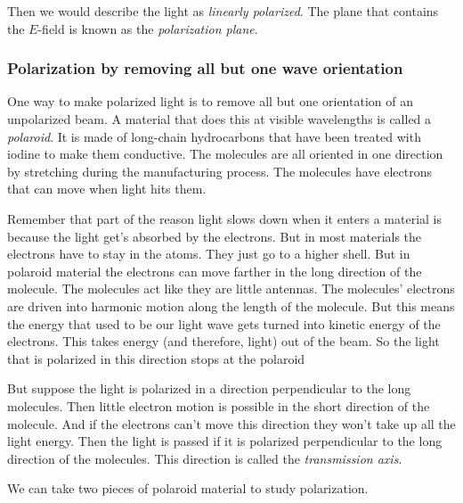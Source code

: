 \documentclass{article}
\begin{document}
Then we would describe the light as \emph{linearly polarized}. The plane
that contains the $E$-field is known as the \emph{polarization plane}.

\subsubsection{Polarization by removing all but one wave orientation}

One way to make polarized light is to remove all but one orientation of an
unpolarized beam. A material that does this at visible wavelengths is called
a \emph{polaroid}. It is made of long-chain hydrocarbons that have been
treated with iodine to make them conductive. The molecules are all oriented
in one direction by stretching during the manufacturing process. The
molecules have electrons that can move when light hits them.

Remember that part of the reason light slows down when it enters a material
is because the light get's absorbed by the electrons. But in most materials
the electrons have to stay in the atoms. They just go to a higher shell. But
in polaroid material the electrons can move farther in the long direction of
the molecule. The molecules act like they are little antennas. The
molecules' electrons are driven into harmonic motion along the length of the
molecule. But this means the energy that used to be our light wave gets
turned into kinetic energy of the electrons. This takes energy (and
therefore, light) out of the beam. So the light that is polarized in this
direction stops at the polaroid

But suppose the light is polarized in a direction perpendicular to the long
molecules. Then little electron motion is possible in the short direction of
the molecule. And if the electrons can't move this direction they won't take
up all the light energy. Then the light is passed if it is polarized
perpendicular to the long direction of the molecules. This direction is
called the \emph{transmission axis}.

We can take two pieces of polaroid material to study polarization.
\end{document}

